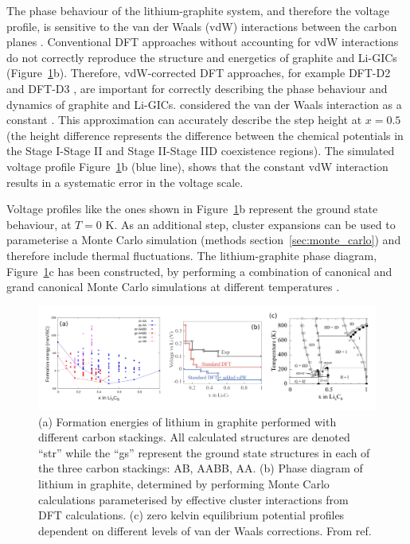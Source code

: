 \documentclass[../main.tex]{subfiles}
\begin{document}
The phase behaviour of the lithium-graphite system, and therefore the voltage profile, is sensitive to the van der Waals (vdW) interactions between the carbon planes \cite{thinius2014theoretical, Hakim,persson2010}.
Conventional DFT approaches without accounting for vdW interactions do not correctly reproduce the structure and energetics of graphite and Li-GICs \cite{thinius2014theoretical, Hakim,persson2010} (Figure~\ref{fig:persson_graphitephases}b). Therefore, vdW-corrected DFT approaches, for example DFT-D2 \cite{Grimme-1} and DFT-D3 \cite{Grimme-3}, are important for correctly describing the phase behaviour and dynamics of graphite and Li-GICs. \citeauthor{persson2010} considered the van der Waals interaction as a constant \cite{persson2010}. This approximation can accurately describe the step height at $x=0.5$ (the height difference represents the difference between the chemical potentials in the Stage I-Stage II and Stage II-Stage IID coexistence regions). The simulated voltage profile Figure~\ref{fig:persson_graphitephases}b (blue line), shows that the constant vdW interaction results in a systematic error in the voltage scale.

Voltage profiles like the ones shown in Figure~\ref{fig:persson_graphitephases}b represent the ground state behaviour, at $T = 0$ K. As an additional step, cluster expansions can be used to parameterise a Monte Carlo simulation (methods section~\ref{sec:monte_carlo}) and therefore include thermal fluctuations. The lithium-graphite phase diagram, Figure~\ref{fig:persson_graphitephases}c has been constructed, by performing a combination of canonical and grand canonical Monte Carlo simulations at different temperatures \cite{persson2010}. 

\begin{figure}
    \centering
    \includegraphics[scale=0.45]{figures/cluster_expansions_persson.png}
    \caption{(a) Formation energies of lithium in graphite performed with different carbon stackings. All calculated structures are denoted ``str'' while the ``gs'' represent the ground state structures in each of the three carbon stackings: AB, AABB, AA. (b) Phase diagram of lithium in graphite, determined by performing Monte Carlo calculations parameterised by effective cluster interactions from DFT calculations. (c) zero kelvin equilibrium potential profiles dependent on different levels of van der Waals corrections. From ref. }
    \label{fig:persson_graphitephases}
\end{figure}
\end{document}
